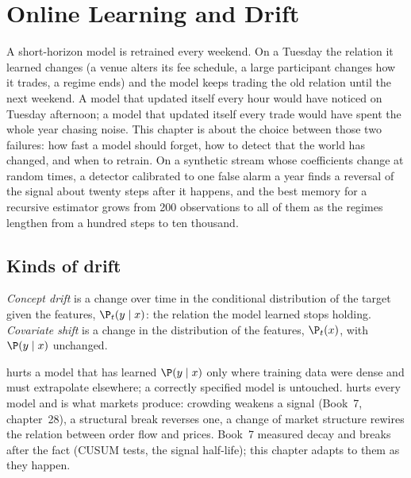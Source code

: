 \chapter{Online Learning and Drift}\label{ch:ml:online-learning-and-drift}

A short-horizon model is retrained every weekend. On a Tuesday the relation it learned changes (a venue alters its fee
schedule, a large participant changes how it trades, a regime ends) and the model keeps trading the old relation until
the next weekend. A model that updated itself every hour would have noticed on Tuesday afternoon; a model that updated
itself every trade would have spent the whole year chasing noise. This chapter is about the choice between those two
failures: how fast a model should forget, how to detect that the world has changed, and when to retrain. On a
synthetic stream whose coefficients change at random times, a detector calibrated to one false alarm a year finds a
reversal of the signal about twenty steps after it happens, and the best memory for a recursive estimator grows from 200
observations to all of them as the regimes lengthen from a hundred steps to ten thousand.

\section{Kinds of drift}

\begin{definition}\label{def:ml:online-learning-and-drift:drift}
\emph{Concept drift} is a change over time in the conditional distribution of the target given the
features, $\P_t(y\mid x)$: the relation the model learned stops holding. \emph{Covariate shift}
is a change in the distribution of the features, $\P_t(x)$, with $\P(y\mid x)$ unchanged.
\end{definition}

 hurts a model that has learned $\P(y\mid x)$ only where training data were dense and must extrapolate
elsewhere; a correctly specified model is untouched.  hurts every model and is what markets produce:
crowding weakens a signal (Book~7, chapter~28), a structural break reverses one, a change of market structure rewires the
relation between order flow and prices. Book~7 measured decay and breaks after the fact (CUSUM tests, the signal
half-life); this chapter adapts to them as they happen.

